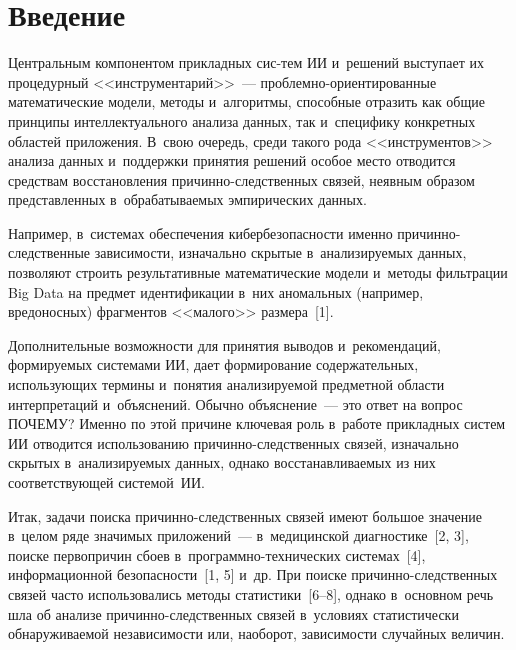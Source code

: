 \begin{multicols}{2}

\label{st\stat}
  
  \section{Введение }
  
  
  Центральным компонентом прикладных сис-\linebreak тем ИИ и~решений выступает их процедурный <<инструментарий>>~---  
проб\-лем\-но-ори\-ен\-ти\-ро\-ван\-ные математические модели, методы 
и~алгоритмы, способные отразить как общие принципы интеллектуального 
анализа данных, так и~специфику конкретных областей приложения. В~свою 
очередь, среди такого рода <<инструментов>> анализа данных и~поддержки 
принятия решений особое место отводится средствам восстановления  
при\-чин\-но-след\-ст\-вен\-ных связей, неявным образом представленных 
в~обрабатываемых эмпирических данных.
  
  Например, в~системах обеспечения ки\-бер\-безопас\-ности именно  
при\-чин\-но-след\-ст\-вен\-ные зависимости, изначально скрытые 
в~ана\-ли\-зи\-ру\-емых данных, позволяют строить результативные математические 
модели и~методы фильт\-ра\-ции Big Data на предмет идентификации в~них 
аномальных (например,  вредоносных) фрагментов <<малого>> размера~[1].
  
  Дополнительные возможности для принятия выводов и~рекомендаций, 
формируемых системами ИИ, дает формирование содержательных, 
использующих термины и~понятия анализируемой предметной области 
интерпретаций и~объяснений. Обычно объяснение~--- это ответ на вопрос 
ПОЧЕМУ? Именно по этой причине ключевая роль в~работе прикладных сис\-тем 
ИИ отводится использованию при\-чин\-но-след\-ст\-вен\-ных связей, изначально 
скрытых в~анализируемых данных, однако восстанавливаемых из них 
соответствующей сис\-те\-мой~ИИ.
  
  Итак, задачи поиска при\-чин\-но-след\-ст\-вен\-ных связей имеют большое 
значение в~целом ряде значимых приложений~--- в~медицинской диагностике~[2, 
3], поиске первопричин сбоев в~про\-грам\-мно-тех\-ни\-че\-ских сис\-те\-мах~[4], 
информационной безопас\-ности~[1, 5] и~др. При поиске причинно-следственных 
связей часто использовались методы статистики~[6--8], однако в~основном речь 
шла об анализе при\-чин\-но-след\-ст\-вен\-ных связей в~условиях статистически 
об\-на\-ру\-жи\-ва\-емой не\-за\-ви\-си\-мости или, наоборот, зависимости случайных ве\-ли\-чин. 
{

}
\end{multicols}
